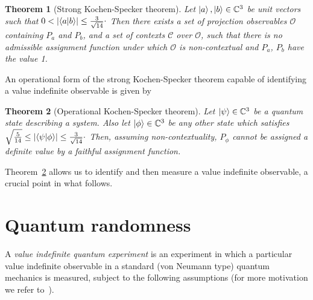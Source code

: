 \documentclass[%
 preprint,
 showpacs,
 showkeys,
 preprintnumbers,
  amsmath,amssymb,
  aps,
 pra,
  longbibliography,
  floatfix,
 ]{revtex4-1}
\theoremstyle{plain}
\newtheorem{theorem}{Theorem}[section]
\newcommand{\iprod}[2]{\langle #1 | #2 \rangle}
\begin{document}
\begin{theorem}[Strong Kochen-Specker theorem]

\label{thm:twonotvaluedefinite}
        Let $\ket{a}, \ket{b}\in \mathbb{C}^3$ be unit vectors such that $0 < |\iprod{a}{b}| \le \frac{3}{\sqrt{14}}\raisebox{.8mm}{.}$
        Then there exists a set of projection observables $\mathcal{O}$ containing $P_a$ and $P_b$, and a set of contexts $\mathcal{C}$ over $\mathcal{O}$, such that there is no admissible assignment function under which $\mathcal{O}$ is non-contextual and $P_a$, $P_b$ have the value 1.
\end{theorem}


An operational form of the strong Kochen-Specker theorem capable of identifying a value indefinite observable is given by


\begin{theorem}[Operational Kochen-Specker theorem]
        \label{thm:VIContext}
        Let $\ket{\psi} \in \mathbb{C}^3$ be a quantum state describing a system.
        Also let $\ket{\phi} \in \mathbb{C}^3$ be any other state which satisfies $\sqrt{\frac{5}{14}} \le |\iprod{\psi}{\phi}| \le \frac{3}{\sqrt{14}}\raisebox{.7mm}{.}$
        Then, assuming non-contextuality, $P_\phi$ cannot be assigned a definite value by a faithful assignment function.
\end{theorem}

Theorem~\ref{thm:VIContext} allows us to identify and then measure a value indefinite observable, a crucial point in what follows.
 \section{Quantum randomness}
 \label{sec:qrand}

  A {\em value indefinite quantum experiment} is an experiment in which a particular  value indefinite observable  in a standard (von Neumann type) quantum mechanics is measured,  subject to the following assumptions (for more motivation we refer to~\cite{ACCS}).

\end{document}
